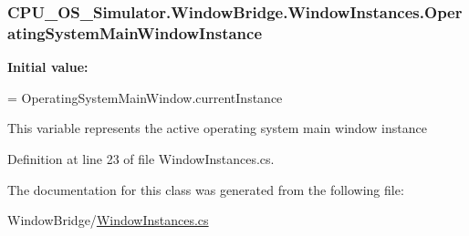 \subsubsection[{Operating\+System\+Main\+Window\+Instance}]{ C\+P\+U\+\_\+\+O\+S\+\_\+\+Simulator.\+Window\+Bridge.\+Window\+Instances.\+Operating\+System\+Main\+Window\+Instance\hspace{0.3cm}{\ttfamily [static]}}\label{class_c_p_u___o_s___simulator_1_1_window_bridge_1_1_window_instances_a151a9fa30e40800129d05845501f7b64}
{\bfseries Initial value\+:}
\begin{DoxyCode}
=
            OperatingSystemMainWindow.currentInstance
\end{DoxyCode}


This variable represents the active operating system main window instance 



Definition at line 23 of file Window\+Instances.\+cs.



The documentation for this class was generated from the following file\+:\begin{DoxyCompactItemize}
\item 
Window\+Bridge/\hyperlink{_window_instances_8cs}{Window\+Instances.\+cs}\end{DoxyCompactItemize}
